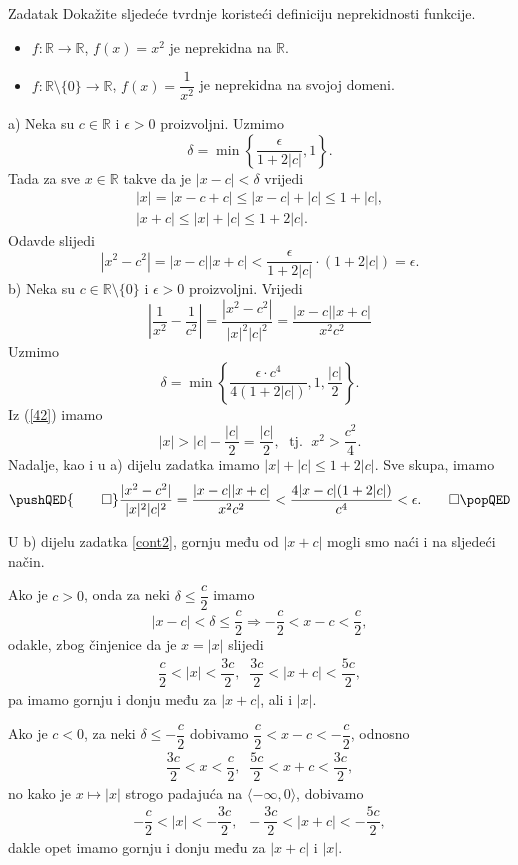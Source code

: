 \begin{exercise}{Zadatak}
\label{cont2}
Dokažite sljedeće tvrdnje koristeći definiciju neprekidnosti funkcije.
\begin{itemize}
\item[a)] \(f : \mathbb{R}\to \mathbb{R}\), \(f(x)=x^2\) je neprekidna na \(\mathbb{R}\).
\item[b)] \(f : \mathbb{R}\setminus\{0\}\to \mathbb{R}\), \(f(x)=\dfrac{1}{x^2}\) je neprekidna na svojoj domeni.
\end{itemize}
\end{exercise}
\begin{proof*}
a) Neka su \(c\in \mathbb{R}\) i \(\epsilon>0\) proizvoljni. Uzmimo \[\delta=\min\left\{\dfrac{\epsilon}{1+2|c|}, 1\right\}.\] 
Tada za sve \(x\in \mathbb{R}\) takve da je \(|x-c|<\delta\) vrijedi 
\begin{gather*}
|x|=|x-c+c|\leq |x-c|+|c|\leq 1+|c|,\\
|x+c|\leq |x|+|c|\leq 1+2|c|.
\end{gather*}
Odavde slijedi
\[|x^2-c^2|=|x-c||x+c|<\dfrac{\epsilon}{1+2|c|}\cdot(1+2|c|)=\epsilon.\]
b) Neka su \(c\in \mathbb{R}\setminus\{0\}\) i \(\epsilon>0\) proizvoljni. Vrijedi
\[\left\lvert \dfrac{1}{x^2}-\dfrac{1}{c^2}\right\rvert=\dfrac{|x^2-c^2|}{|x|^2|c|^2}=\dfrac{|x-c||x+c|}{x^2c^2}\]
Uzmimo
\[\delta=\min\left\{\dfrac{\epsilon\cdot c^4}{4\left(1+2|c|\right)}, 1, \dfrac{|c|}{2}\right\}.\]
Iz (\ref{42}) imamo \[|x|>|c|-\dfrac{|c|}{2}=\dfrac{|c|}{2},\; \text{ tj. }\; x^2>\dfrac{c^2}{4}.\]
Nadalje, kao i u a) dijelu zadatka imamo \(|x|+|c|\leq 1+2|c|\). Sve skupa, imamo
\[
\pushQED{\qed}
\dfrac{|x^2-c^2|}{|x|^2|c|^2}=\dfrac{|x-c||x+c|}{x^2c^2}<\dfrac{4|x-c|(1+2|c|)}{c^4}<\epsilon.\qedhere
\popQED
\]
\end{proof*}
\begin{remark}
U b) dijelu zadatka \ref{cont2}, gornju među od \(|x+c|\) mogli smo naći i na sljedeći način.

Ako je \(c>0\), onda za neki \(\delta\leq \dfrac{c}{2}\) imamo
\[|x-c|< \delta\leq \dfrac{c}{2} \Longrightarrow -\dfrac{c}{2}<x-c<\dfrac{c}{2},\]
odakle, zbog činjenice da je \(x=|x|\) slijedi
\begin{gather}
\label{44}
\dfrac{c}{2}<|x|<\dfrac{3c}{2},\;\; \dfrac{3c}{2}<|x+c|<\dfrac{5c}{2},
\end{gather}
pa imamo gornju i donju među za \(|x+c|\), ali i \(|x|\).

Ako je \(c<0\), za neki \(\delta\leq -\dfrac{c}{2}\)  dobivamo \(\dfrac{c}{2}<x-c<-\dfrac{c}{2}\), odnosno 
\begin{gather*}
\dfrac{3c}{2}<x<\dfrac{c}{2},\;\; \dfrac{5c}{2}<x+c<\dfrac{3c}{2},
\end{gather*}
no kako je \(x\mapsto |x|\) strogo padajuća na \(\langle -\infty, 0\rangle\), dobivamo
\begin{gather*}
-\dfrac{c}{2}<|x|<-\dfrac{3c}{2},\;\; -\dfrac{3c}{2}<|x+c|<-\dfrac{5c}{2},
\end{gather*}
dakle opet imamo gornju i donju među za \(|x+c|\) i \(|x|\).
\end{remark}
